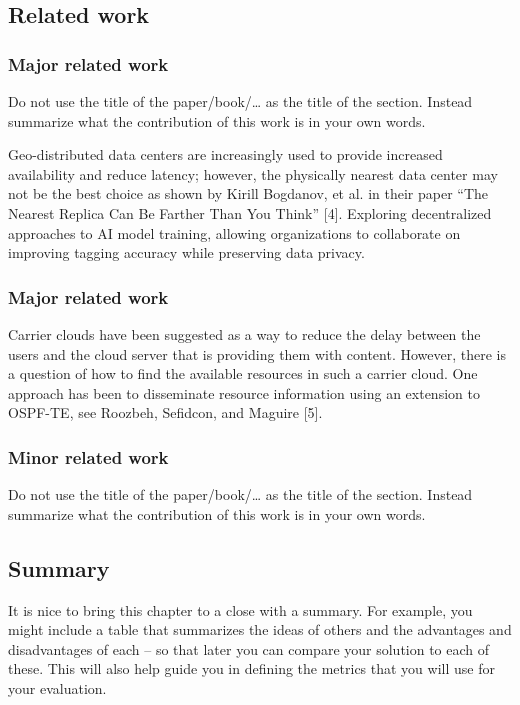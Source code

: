 \documentclass[a4paper,10pt,twocolumn]{article}
\numberwithin{figure}{section}
\numberwithin{table}{section}
\begin{document}
\subsection{Related work}
\subsubsection{Major related work}
Do not use the title of the paper/book/… as the title of the section. Instead summarize what the contribution of this work is in your own words.

Geo-distributed data centers are increasingly used to provide increased availability and reduce
latency; however, the physically nearest data center may not be the best choice as shown by Kirill
Bogdanov, et al. in their paper “The Nearest Replica Can Be Farther Than You Think” [4].
Exploring decentralized approaches to AI model training, allowing organizations to collaborate on improving tagging accuracy while preserving data privacy.

\subsubsection{Major related work}
Carrier clouds have been suggested as a way to reduce the delay between the users and the cloud
server that is providing them with content. However, there is a question of how to find the available
resources in such a carrier cloud. One approach has been to disseminate resource information using
an extension to OSPF-TE, see Roozbeh, Sefidcon, and Maguire [5].

\subsubsection{Minor related work}
Do not use the title of the paper/book/… as the title of the section. Instead summarize what the contribution of this work is in your own words.

\subsection{Summary}
It is nice to bring this chapter to a close with a summary. For example, you might include a table that summarizes the ideas of others and the advantages and disadvantages of each – so that later you can compare your solution to each of these. This will also help guide you in defining the metrics that you will use for your evaluation.


\end{document}
